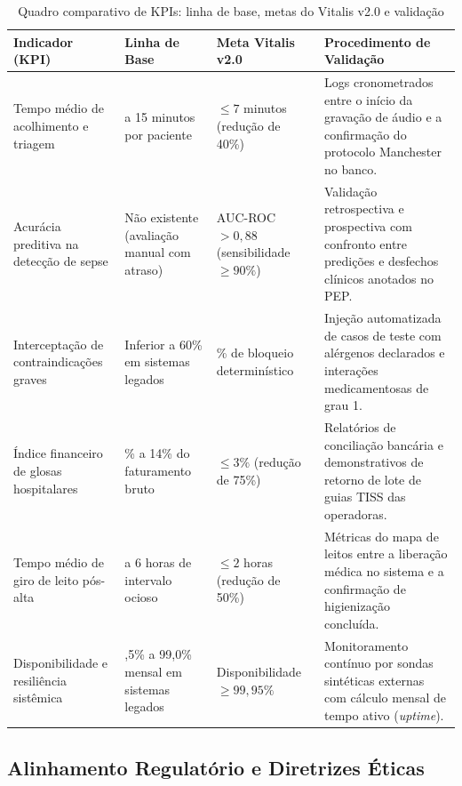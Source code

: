 \begin{table}[!htbp]
\centering
\small
\setlength{\tabcolsep}{5pt}
\caption{Quadro comparativo de KPIs: linha de base, metas do Vitalis v2.0 e validação}
\label{tab:kpis_projeto}
\begin{tabularx}{\textwidth}{>{\raggedright\arraybackslash}p{3.0cm} >{\raggedright\arraybackslash}p{2.8cm} >{\raggedright\arraybackslash}p{2.8cm} >{\raggedright\arraybackslash}X}
\toprule
\textbf{Indicador (KPI)} & \textbf{Linha de Base} & \textbf{Meta Vitalis v2.0} & \textbf{Procedimento de Validação} \\
\midrule
Tempo médio de acolhimento e triagem &
12 a 15 minutos por paciente &
$\le 7$ minutos (redução de 40\%) &
Logs cronometrados entre o início da gravação de áudio e a confirmação do protocolo Manchester no banco. \\
\addlinespace
Acurácia preditiva na detecção de sepse &
Não existente (avaliação manual com atraso) &
AUC-ROC $> 0{,}88$ (sensibilidade $\ge 90\%$) &
Validação retrospectiva e prospectiva com confronto entre predições e desfechos clínicos anotados no PEP. \\
\addlinespace
Interceptação de contraindicações graves &
Inferior a 60\% em sistemas legados &
100\% de bloqueio determinístico &
Injeção automatizada de casos de teste com alérgenos declarados e interações medicamentosas de grau 1. \\
\addlinespace
Índice financeiro de glosas hospitalares &
8\% a 14\% do faturamento bruto &
$\le 3\%$ (redução de 75\%) &
Relatórios de conciliação bancária e demonstrativos de retorno de lote de guias TISS das operadoras. \\
\addlinespace
Tempo médio de giro de leito pós-alta &
3 a 6 horas de intervalo ocioso &
$\le 2$ horas (redução de 50\%) &
Métricas do mapa de leitos entre a liberação médica no sistema e a confirmação de higienização concluída. \\
\addlinespace
Disponibilidade e resiliência sistêmica &
98,5\% a 99,0\% mensal em sistemas legados &
Disponibilidade $\ge 99{,}95\%$ &
Monitoramento contínuo por sondas sintéticas externas com cálculo mensal de tempo ativo (\textit{uptime}). \\
\bottomrule
\end{tabularx}
\end{table}

\subsection{Alinhamento Regulatório e Diretrizes Éticas}
\label{subsec:alinhamento_regulatorio}

